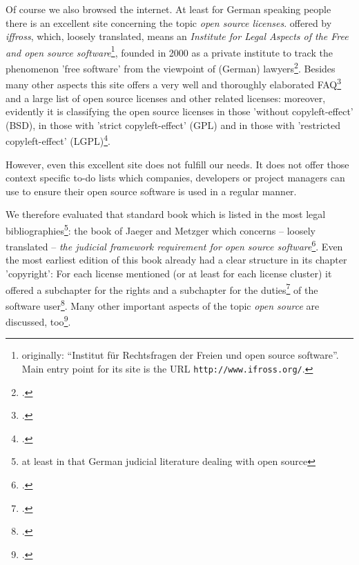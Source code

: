 Of course we also browsed the internet. At least for German speaking people
there is an excellent site concerning the topic \emph{open source licenses}.
offered by \textit{iffross}, which, loosely translated, means an
\textit{Institute for Legal Aspects of the Free and open source
software}\footnote{originally: \enquote{Institut für Rechtsfragen der Freien und
open source software}. Main entry point for its site is the URL
\texttt{http://www.ifross.org/}.}, founded in 2000 as a private institute to
track the phenomenon 'free software' from the viewpoint of (German)
lawyers\footcite[cf.][\nopage wp]{ifross2011b}. Besides many other
aspects this site offers a very well and thoroughly elaborated
FAQ\footcite[cf.][\nopage wp]{ifross2011c} and a large list of open
source licenses and other related licenses: moreover, evidently it is
classifying the open source licenses in those 'without copyleft-effect' (BSD),
in those with 'strict copyleft-effect' (GPL) and in those with 'restricted
copyleft-effect' (LGPL)\footcite[cf.][\nopage wp]{ifross2011a}.

However, even this excellent site does not fulfill our needs. It does not offer
those context specific to-do lists which companies, developers or project
managers can use to ensure their open source software is used in a regular
manner.

We therefore evaluated that standard book which is listed in the most legal
bibliographies\footnote{at least in that German judicial literature dealing with
open source}: the book of Jaeger and Metzger which concerns -- loosely translated
-- \textit{the judicial framework requirement for open source
software}\footcite[cf.][V -- It can not be any surprise that both authors,
Mr. Jaeger and Mr. Metzger are members of ifross (cf.
\texttt{http://www.ifross.org/personen/}, wp)]{JaeMet2002a}. Even the most
earliest edition of this book already had a clear structure in its chapter
'copyright': For each license mentioned (or at least for each license cluster)
it offered a subchapter for the rights and a subchapter for the
duties\footcite[cf.][30ff]{JaeMet2002a} of the software user\footcite[For
getting a good survey of the structure and the line of thought see the contents
cf.][VIIIf]{JaeMet2002a}. Many other important aspects of the topic
\textit{open source} are discussed, too\footcite[pars pro toto: have a
look at the chapter concerning the liability: cf.][137ff]{JaeMet2002a}.

